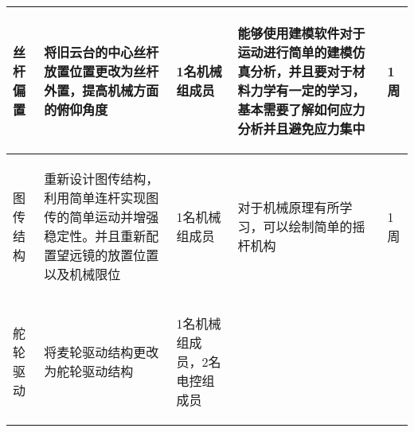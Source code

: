 \begin{longtable}{ p{2cm} | p{3cm} | p{3cm} | p{4.8cm} | p{2cm} |}
    \hline
        \begin{center}
            丝杆偏置
        \end{center} &
        \begin{center}
            将旧云台的中心丝杆放置位置更改为丝杆外置，提高机械方面的俯仰角度
        \end{center} &
        \begin{center}
            1名机械组成员
        \end{center} &
        \begin{center}
            能够使用建模软件对于运动进行简单的建模仿真分析，并且要对于材料力学有一定的学习，基本需要了解如何应力分析并且避免应力集中
        \end{center} &
        \begin{center}
            1周
        \end{center}\\

    \hline
    
        \begin{center}
            图传结构
        \end{center} &
        \begin{center}
            重新设计图传结构，利用简单连杆实现图传的简单运动并增强稳定性。并且重新配置望远镜的放置位置以及机械限位
        \end{center} &
        \begin{center}
            1名机械组成员
        \end{center} &
        \begin{center}
            对于机械原理有所学习，可以绘制简单的摇杆机构
        \end{center} &
        \begin{center}
            1周
        \end{center} \\
        
    \hline
    
        \begin{center}
            舵轮驱动
        \end{center} &
        \begin{center}
            将麦轮驱动结构更改为舵轮驱动结构
        \end{center} &
        \begin{center}
            1名机械组成员，2名电控组成员
        \end{center} &
        \begin{center}
            

\end{center}
\end{longtable}
